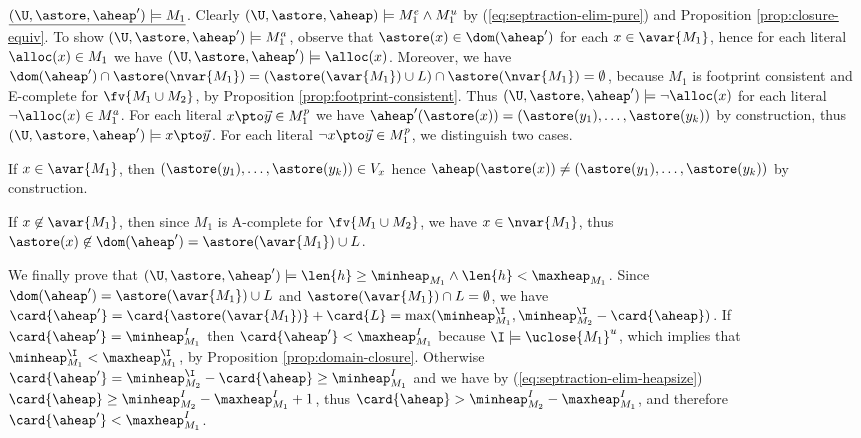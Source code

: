 {  \noindent
  $\underline{(\U,\astore,\aheap') \models M_1}$. Clearly
  $(\U,\astore,\aheap) \models %
  M_1^e \wedge M_1^u$ by
  (\ref{eq:septraction-elim-pure}) and Proposition
  \ref{prop:closure-equiv}. To show $(\U,\astore,\aheap') \models
  M_1^a$, observe that $\astore(x) \in \dom(\aheap')$ for each $x \in
  \avar{M_1}$, hence for each literal $\alloc(x) \in M_1$ we have
  $(\U,\astore,\aheap') \models \alloc(x)$. Moreover, we have
  $\dom(\aheap') \cap \astore(\nvar{M_1}) = (\astore(\avar{M_1}) \cup
  L) \cap \astore(\nvar{M_1}) = \emptyset$, because $M_1$ is footprint
  consistent and E-complete for $\fv{M_1 \cup M_2}$, by Proposition
  \ref{prop:footprint-consistent}. Thus $(\U,\astore,\aheap') \models
  \neg\alloc(x)$ for each literal $\neg\alloc(x) \in M_1^a$. For each
  literal $x \pto \vec{y} \in M_1^p$ we have $\aheap'(\astore(x)) =
  (\astore(y_1),\ldots,\astore(y_k))$ by construction, thus
  $(\U,\astore,\aheap') \models x \pto \vec{y}$. For each literal
  $\neg x \pto \vec{y} \in M_1^p$, we distinguish two
  cases. \begin{compactitem}
    \item If $x \in \avar{M_1}$, then
      $(\astore(y_1),\ldots,\astore(y_k)) \in V_x$ hence
      $\aheap(\astore(x)) \neq (\astore(y_1),\ldots,\astore(y_k))$ by construction.
    \item If $x \not\in \avar{M_1}$, then since $M_1$ is A-complete for
      $\fv{M_1 \cup M_2}$, we have $x \in \nvar{M_1}$, thus
      $\astore(x) \not\in \dom(\aheap') = \astore(\avar{M_1}) \cup L$.
  \end{compactitem}
  
  We finally prove that $(\U,\astore,\aheap') \models \len{h} \geq
  \minheap_{M_1} \wedge \len{h} < \maxheap_{M_1}$.  Since
  $\dom(\aheap') = \astore(\avar{M_1}) \cup L$ and
  $\astore(\avar{M_1}) \cap L = \emptyset$, we have $\card{\aheap'} =
  \card{\astore(\avar{M_1})} + \card{L} = \max(\minheap^\I_{M_1},
  \minheap^\I_{M_2} - \card{\aheap})$.  If $\card{\aheap'} =
  \minheap^I_{M_1}$ then $\card{\aheap'} < \maxheap^I_{M_1}$ because
  $\I \models \uclose{M_1}^u$, which implies that $\minheap^\I_{M_1} <
  \maxheap^\I_{M_1}$, by Proposition
  \ref{prop:domain-closure}. Otherwise $\card{\aheap'} =
  \minheap^\I_{M_2} - \card{\aheap} \geq \minheap^I_{M_1}$
  and we have by
  (\ref{eq:septraction-elim-heapsize}) $\card{\aheap} \geq
  \minheap^I_{M_2} - \maxheap^I_{M_1} + 1$, thus $\card{\aheap} >
  \minheap^I_{M_2} - \maxheap^I_{M_1}$, and therefore $\card{\aheap'}
  <\maxheap^I_{M_1}$.

}
